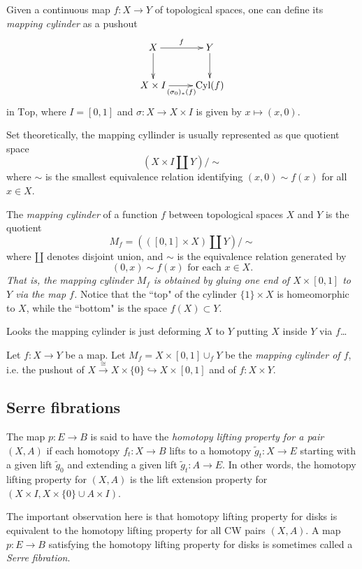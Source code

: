 \begin{definition}
\label{definition-https-ncatl-org-nlab-2}
Given a continuous map $f:X\to Y$ of
topological spaces, one can define its {\it
mapping cylinder} as a pushout
$$
\xymatrix{
		X\ar[r]^{f}\ar[d]&Y\ar[d]\\
		X\times
		I\ar[r]_{(\sigma_0)_*(f)}&\text{Cyl}(f)
	}
$$
	in $\text{Top}$, where $I=[0,1]$ and
	$\sigma:X\to X\times I$ is given by
	$x\mapsto(x,0)$.

	Set theoretically, the mapping cyllinder is
	usually represented as que quotient space
	$$\left(X\times I\coprod Y\right)\Big/\sim$$
	where $\sim$ is the smallest equivalence
	relation identifying $(x,0)\sim f(x)$ for
	all $x\in X$.
\end{definition}

\begin{definition}
\label{definition-https-en-wikip-org-wik-2}
The {\it mapping cylinder} of a function $f$
between topological spaces $X$ and $Y$ is the
quotient
$$M_f=(([0,1]\times X)\amalg Y)\big/\sim$$
where $\amalg$ denotes disjoint union, and
$\sim$ is the equivalence relation generated
by
$$(0,x)\sim f(x)\text{ for each }x\in X.$$
{\it That is, the mapping cylinder $M_f$ is
obtained by gluing one end of $X\times[0,1]$
to $Y$ via the map $f$.} Notice that the
``top" of the cylinder $\{1\}\times X$ is
homeomorphic to $X$, while the ``bottom" is
the space $f(X)\subset Y$.

Looks the mapping cylinder is just deforming
$X$ to $Y$ putting $X$ inside $Y$ via $f$…
\end{definition}

\begin{definition}
\label{definition-from-homework}
	Let $f:X\to Y$ be a map. Let
	$M_f=X\times[0,1]\cup_fY$ be the {\it
	mapping cylinder of $f$}, i.e. the pushout
	of
	$X\overset{\cong}{\to}X\times\{0\}
	\hookrightarrow
	X\times[0,1]$ and of $f:X\times Y$.
\end{definition}

\subsection{Serre fibrations}
\label{subsection-serre-fibrations}

\begin{definition}[Hatcher, p. 376]
\label{definition-hatcher-p-376}
		The map $p:E\to B$ is said to have the {\it
		homotopy lifting property for a pair}
		$(X,A)$ if each homotopy $f_t:X\to B$ lifts
		to a homotopy $\tilde{g}_t:X\to E$ starting
		with a given lift $\tilde{g}_0$ and
		extending a given lift $\tilde{g}_t:A\to
		E$. In other words, the homotopy lifting
		property for $(X,A)$ is the lift extension
		property for $(X\times I,X\times\{0\}\cup
		A\times I)$.

	The important observation here is that
	homotopy lifting property for disks is
	equivalent to the homotopy lifting property
	for all CW pairs $(X,A)$. A map $p:E\to B$
	satisfying the homotopy lifting property for
	disks is sometimes called a {\it Serre
	fibration}.
\end{definition}

